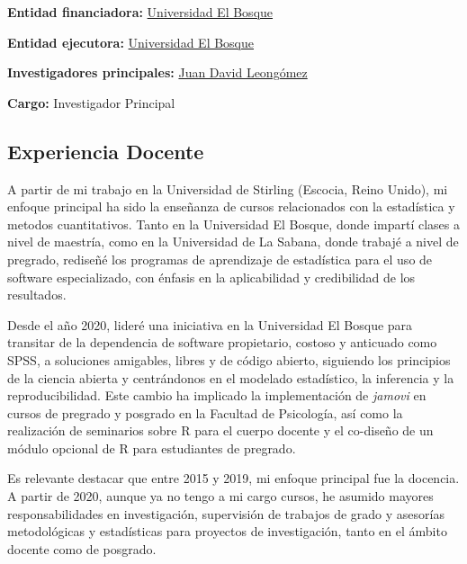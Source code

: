 \documentclass[11pt,a4paper,]{awesome-cv}
\begin{document}
\begin{cventries}
{\begin{cvitems}
\item \textbf{Entidad financiadora:} \href{https://www.unbosque.edu.co/}{Universidad El Bosque}
\item \textbf{Entidad ejecutora:} \href{https://www.unbosque.edu.co/}{Universidad El Bosque}
\item \textbf{Investigadores principales:} \href{https://jdleongomez.info/es/}{Juan David Leongómez}
\item \textbf{Cargo:} Investigador Principal
\end{cvitems}}
\end{cventries}

\hypertarget{experiencia-docente}{%
\subsection{Experiencia Docente}\label{experiencia-docente}}

\begin{footnotesize}
A partir de mi trabajo en la Universidad de Stirling (Escocia, Reino Unido), mi enfoque principal ha sido la enseñanza de cursos relacionados con la estadística y metodos cuantitativos. Tanto en la Universidad El Bosque, donde impartí clases a nivel de maestría, como en la Universidad de La Sabana, donde trabajé a nivel de pregrado, rediseñé los programas de aprendizaje de estadística para el uso de software especializado, con énfasis en la aplicabilidad y credibilidad de los resultados.

Desde el año 2020, lideré una iniciativa en la Universidad El Bosque para transitar de la dependencia de software propietario, costoso y anticuado como SPSS, a soluciones amigables, libres y de código abierto, siguiendo los principios de la ciencia abierta y centrándonos en el modelado estadístico, la inferencia y la reproducibilidad. Este cambio ha implicado la implementación de \textit{jamovi} en cursos de pregrado y posgrado en la Facultad de Psicología, así como la realización de seminarios sobre R para el cuerpo docente y el co-diseño de un módulo opcional de R para estudiantes de pregrado.

Es relevante destacar que entre 2015 y 2019, mi enfoque principal fue la docencia. A partir de 2020, aunque ya no tengo a mi cargo cursos, he asumido mayores responsabilidades en investigación, supervisión de trabajos de grado y asesorías metodológicas y estadísticas para proyectos de investigación, tanto en el ámbito docente como de posgrado.
\end{footnotesize}
\end{document}

